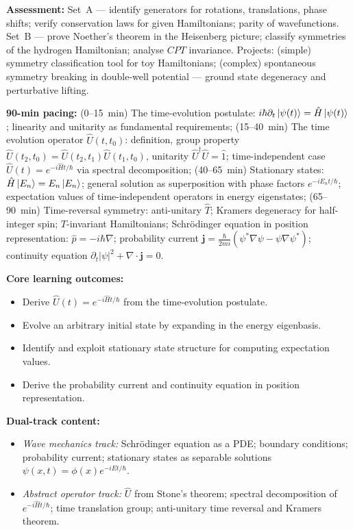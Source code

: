 \documentclass[11pt,a4paper]{article}
\begin{document}
\begin{tcolorbox}[modulebox, title={Module~I.3 / L04: Infinitesimal Generators, Symmetries, and Noether's Theorem}]
\medskip\textbf{Assessment:}
Set~A --- identify generators for rotations, translations, phase shifts;
verify conservation laws for given Hamiltonians; parity of wavefunctions.
Set~B --- prove Noether's theorem in the Heisenberg picture;
classify symmetries of the hydrogen Hamiltonian; analyse $CPT$ invariance.
Projects: (simple) symmetry classification tool for toy Hamiltonians;
(complex) spontaneous symmetry breaking in double-well potential ---
ground state degeneracy and perturbative lifting.
\end{tcolorbox}

\medskip
\begin{tcolorbox}[modulebox, title={Module~I.3 / L05: Time Evolution I --- Time-Independent Hamiltonians}]
\textbf{90-min pacing:} (0--15~min) The time-evolution postulate:
$i\hbar\partial_t\ket{\psi(t)}=\hat{H}\ket{\psi(t)}$; linearity and
unitarity as fundamental requirements;
(15--40~min) The time evolution operator $\hat{U}(t,t_0)$: definition,
group property $\hat{U}(t_2,t_0)=\hat{U}(t_2,t_1)\hat{U}(t_1,t_0)$,
unitarity $\hat{U}^\dagger\hat{U}=\hat{1}$;
time-independent case $\hat{U}(t)=e^{-i\hat{H}t/\hbar}$ via spectral decomposition;
(40--65~min) Stationary states: $\hat{H}\ket{E_n}=E_n\ket{E_n}$;
general solution as superposition with phase factors $e^{-iE_n t/\hbar}$;
expectation values of time-independent operators in energy eigenstates;
(65--90~min) Time-reversal symmetry: anti-unitary $\hat{T}$;
Kramers degeneracy for half-integer spin;
$T$-invariant Hamiltonians; Schr\"odinger equation in position representation:
$\hat{p}=-i\hbar\nabla$; probability current $\mathbf{j}=\tfrac{\hbar}{2mi}(\psi^*\nabla\psi-\psi\nabla\psi^*)$;
continuity equation $\partial_t|\psi|^2+\nabla\cdot\mathbf{j}=0$.

\medskip\textbf{Core learning outcomes:}
\begin{itemize}[leftmargin=1.4em,topsep=2pt,itemsep=1pt]
  \item Derive $\hat{U}(t)=e^{-i\hat{H}t/\hbar}$ from the time-evolution postulate.
  \item Evolve an arbitrary initial state by expanding in the energy eigenbasis.
  \item Identify and exploit stationary state structure for computing expectation values.
  \item Derive the probability current and continuity equation in position representation.
\end{itemize}

\medskip\textbf{Dual-track content:}
\begin{itemize}[leftmargin=1.4em,topsep=2pt,itemsep=1pt]
  \item \textit{Wave mechanics track:} Schr\"odinger equation as a PDE; boundary conditions;
    probability current; stationary states as separable solutions $\psi(x,t)=\phi(x)e^{-iEt/\hbar}$.
  \item \textit{Abstract operator track:} $\hat{U}$ from Stone's theorem; spectral decomposition
    of $e^{-i\hat{H}t/\hbar}$; time translation group; anti-unitary time reversal
    and Kramers theorem.
\end{itemize}


\end{tcolorbox}
\end{document}
